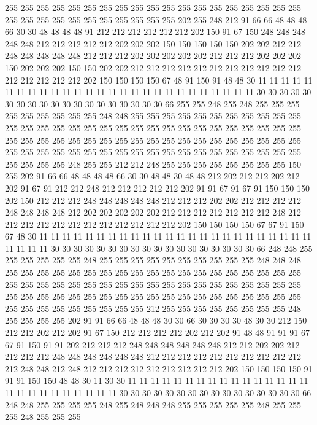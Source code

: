 255 255 255 255 255 255 255 255 255 255 255 255 255 255 255 255 255 255 255 255
255 255 255 255 255 255 255 255 255 255 202 255 248 212 91 66 66 48 48 48
66 30 30 48 48 48 48 91 212 212 212 212 212 212 202 150 91 67 150 248
248 248 248 248 212 212 212 212 212 202 202 202 150 150 150 150 150 202 202 212
212 248 248 248 248 248 212 212 212 202 202 202 202 202 212 212 212 202 202 202
150 202 202 202 150 150 202 202 212 212 212 212 212 212 212 212 212 212 212 212
212 212 212 212 202 150 150 150 150 67 48 91 150 91 48 48 30 11 11 11
11 11 11 11 11 11 11 11 11 11 11 11 11 11 11 11 11 11 11 11
11 11 11 11 30 30 30 30 30 30 30 30 30 30 30 30 30 30 30 30
30 30 30 66 255 255 248 255 248 255 255 255 255 255 255 255 255 255 248 248
255 255 255 255 255 255 255 255 255 255 255 255 255 255 255 255 255 255 255 255
255 255 255 255 255 255 255 255 255 255 255 255 255 255 255 255 255 255 255 255
255 255 255 255 255 255 255 255 255 255 255 255 255 255 255 255 255 255 255 255
255 255 255 255 255 255 255 255 255 255 255 255 248 255 255 212 212 248 255 255
255 255 255 255 255 255 150 255 202 91 66 66 48 48 48 48 66 30 30 48
48 30 48 48 212 202 212 212 202 212 202 91 67 91 212 212 248 212 212 212
212 212 202 91 91 67 91 67 91 150 150 150 202 150 212 212 212 248 248 248
248 248 212 212 212 202 202 212 212 212 212 248 248 248 248 212 202 202 202 202
202 212 212 212 212 212 212 212 248 212 212 212 212 212 212 212 212 212 212 212
212 202 150 150 150 150 67 67 91 150 67 48 30 11 11 11 11 11 11 11
11 11 11 11 11 11 11 11 11 11 11 11 11 11 11 11 11 11 11 11
11 30 30 30 30 30 30 30 30 30 30 30 30 30 30 30 30 30 30 66
248 248 255 255 255 255 255 255 248 255 255 255 255 255 255 255 255 255 255 248
248 248 255 255 255 255 255 255 255 255 255 255 255 255 255 255 255 255 255 255
255 255 255 255 255 255 255 255 255 255 255 255 255 255 255 255 255 255 255 255
255 255 255 255 255 255 255 255 255 255 255 255 255 255 255 255 255 255 255 255
255 255 255 255 255 255 255 255 212 255 255 255 255 255 255 255 255 248 255 255
255 255 202 91 91 66 66 48 48 48 30 30 66 30 30 30 30 48 30 30
212 150 212 212 202 212 202 91 67 150 212 212 212 212 202 212 202 91 48 48
91 91 91 67 67 91 150 91 91 202 212 212 212 248 248 248 248 248 248 212
212 202 202 212 212 212 212 248 248 248 248 248 248 212 212 212 212 212 212 212
212 212 212 212 248 248 212 248 212 212 212 212 212 212 212 212 212 202 150 150
150 150 91 91 91 150 150 48 48 30 11 30 30 11 11 11 11 11 11 11
11 11 11 11 11 11 11 11 11 11 11 11 11 11 11 11 11 11 11 30
30 30 30 30 30 30 30 30 30 30 30 30 30 30 30 66 248 248 255 255
255 255 248 255 248 248 248 255 255 255 255 255 248 255 255 255 248 255 255 255
